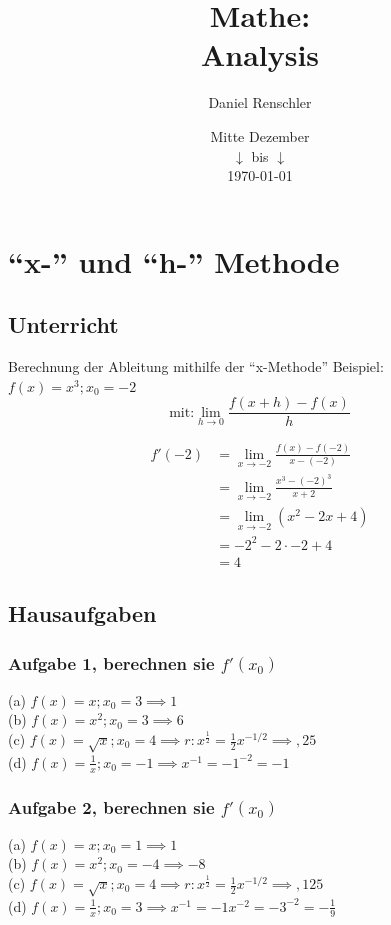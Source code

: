 \documentclass{report}
\title{\Huge{Mathe:}\\Analysis}
\author{\huge{Daniel Renschler}}
\date{Mitte Dezember\\ $\downarrow$ bis $\downarrow$ \\ \today}
\begin{document}
\maketitle

\tableofcontents
\clearpage



\section{``x-'' und ``h-'' Methode}
\subsection{Unterricht}
Berechnung der Ableitung mithilfe der ``x-Methode''
Beispiel: $f(x)=x^{3}; x_{0}=-2$ 
\begin{equation}
\text{mit:} \lim_{h \rightarrow 0} \frac{f(x+h)-f(x)}{h}
\end{equation}

\begin{align*}
     f'(-2) & = \lim_{x\to-2}\frac{f(x)-f(-2)}{x-(-2)} \\
			& = \lim_{x\to-2}\frac{x^{3}-(-2)^3}{x+2} \\
			& = \lim_{x\to-2}(x^{2}-2x+4) \\
			& = -2^{2}-2\cdot -2+4\\
			& = 4
\end{align*}

\subsection{Hausaufgaben}
\subsubsection{Aufgabe 1, berechnen sie $f'(x_0)$}
(a)	$f(x)=x;x_{0}=3 \implies 1$\\
(b)	$f(x)=x^{2};x_{0}=3 \implies 6$\\
(c)	$f(x)=\sqrt{x};x_{0}=4 \implies r: x^{\frac{1}{2}}=\frac{1}{2}x^{-1/2}\implies ,25$\\
(d)	$f(x)=\frac{1}{x};x_{0}=-1 \implies x^{-1}=-1^{-2}=-1$

\subsubsection{Aufgabe 2, berechnen sie $f'(x_0)$}
(a)	$f(x)=x;x_{0}=1 \implies 1$\\
(b)	$f(x)=x^{2};x_{0}=-4 \implies -8$\\
(c)	$f(x)=\sqrt{x};x_{0}=4 \implies r: x^{\frac{1}{2}}=\frac{1}{2}x^{-1/2}\implies ,125$\\
(d)	$f(x)=\frac{1}{x};x_{0}=3 \implies x^{-1}=-1x^{-2}=-3^{-2}=-\frac{1}{9}$
\end{document}
